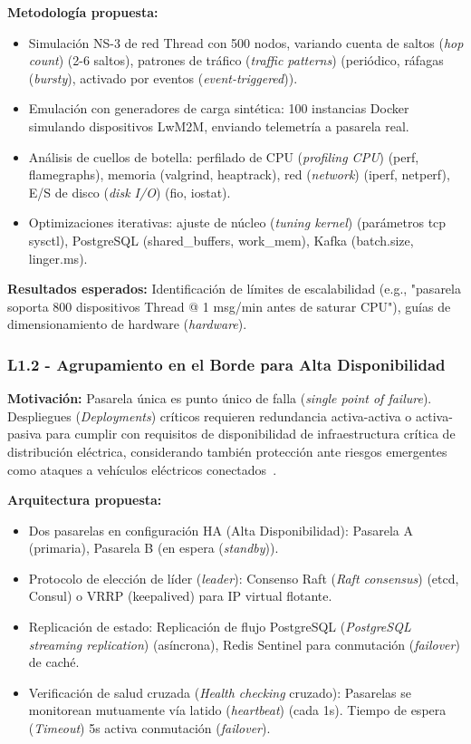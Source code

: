 \textbf{Metodología propuesta:}
\begin{itemize}
\item Simulación NS-3 de red Thread con 500 nodos, variando cuenta de saltos (\textit{hop count}) (2-6 saltos), patrones de tráfico (\textit{traffic patterns}) (periódico, ráfagas (\textit{bursty}), activado por eventos (\textit{event-triggered})).
\item Emulación con generadores de carga sintética: 100 instancias Docker simulando dispositivos LwM2M, enviando telemetría a pasarela real.
\item Análisis de cuellos de botella: perfilado de CPU (\textit{profiling CPU}) (perf, flamegraphs), memoria (valgrind, heaptrack), red (\textit{network}) (iperf, netperf), E/S de disco (\textit{disk I/O}) (fio, iostat).
\item Optimizaciones iterativas: ajuste de núcleo (\textit{tuning kernel}) (parámetros tcp sysctl), PostgreSQL (shared\_buffers, work\_mem), Kafka (batch.size, linger.ms).
\end{itemize}

\textbf{Resultados esperados:} Identificación de límites de escalabilidad (e.g., "pasarela soporta 800 dispositivos Thread @ 1 msg/min antes de saturar CPU"), guías de dimensionamiento de hardware (\textit{hardware}).

\subsubsection{L1.2 - Agrupamiento en el Borde para Alta Disponibilidad}

\textbf{Motivación:} Pasarela única es punto único de falla (\textit{single point of failure}). Despliegues (\textit{Deployments}) críticos requieren redundancia activa-activa o activa-pasiva para cumplir con requisitos de disponibilidad de infraestructura crítica de distribución eléctrica, considerando también protección ante riesgos emergentes como ataques a vehículos eléctricos conectados~\cite{basnetNetworkingPowerGrid2025,talaatFortifyingEVCharging2025}.

\textbf{Arquitectura propuesta:}
\begin{itemize}
\item Dos pasarelas en configuración HA (Alta Disponibilidad): Pasarela A (primaria), Pasarela B (en espera (\textit{standby})).
\item Protocolo de elección de líder (\textit{leader}): Consenso Raft (\textit{Raft consensus}) (etcd, Consul) o VRRP (keepalived) para IP virtual flotante.
\item Replicación de estado: Replicación de flujo PostgreSQL (\textit{PostgreSQL streaming replication}) (asíncrona), Redis Sentinel para conmutación (\textit{failover}) de caché.
\item Verificación de salud cruzada (\textit{Health checking} cruzado): Pasarelas se monitorean mutuamente vía latido (\textit{heartbeat}) (cada 1s). Tiempo de espera (\textit{Timeout}) 5s activa conmutación (\textit{failover}).
\end{itemize}

